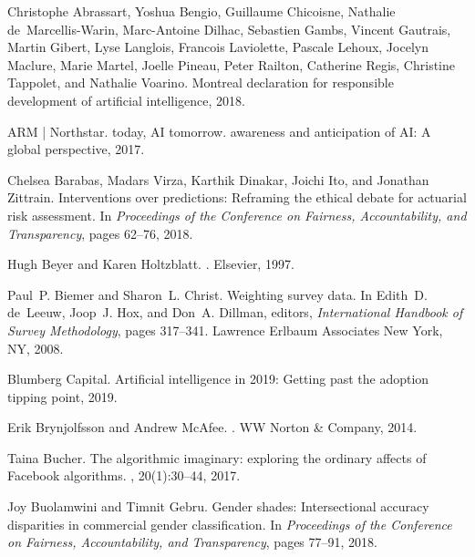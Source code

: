 \documentclass[11pt]{article} %
\begin{document}

\footnotesize
\begin{thebibliography}{10}

Christophe Abrassart, Yoshua Bengio, Guillaume Chicoisne, Nathalie
  de~Marcellis-Warin, Marc-Antoine Dilhac, Sebastien Gambs, Vincent Gautrais,
  Martin Gibert, Lyse Langlois, Francois Laviolette, Pascale Lehoux, Jocelyn
  Maclure, Marie Martel, Joelle Pineau, Peter Railton, Catherine Regis,
  Christine Tappolet, and Nathalie Voarino.
\newblock Montreal declaration for responsible development of artificial
  intelligence, 2018.

{ARM | Northstar}.
 today, {AI} tomorrow. awareness and anticipation of {AI}: A
  global perspective, 2017.

Chelsea Barabas, Madars Virza, Karthik Dinakar, Joichi Ito, and Jonathan
  Zittrain.
\newblock Interventions over predictions: Reframing the ethical debate for
  actuarial risk assessment.
\newblock In {\em Proceedings of the Conference on Fairness, Accountability,
  and Transparency}, pages 62--76, 2018.

Hugh Beyer and Karen Holtzblatt.
.
\newblock Elsevier, 1997.

Paul~P. Biemer and Sharon~L. Christ.
\newblock Weighting survey data.
\newblock In Edith~D. de~Leeuw, Joop~J. Hox, and Don~A. Dillman, editors, {\em
  International Handbook of Survey Methodology}, pages 317--341. Lawrence
  Erlbaum Associates New York, NY, 2008.

{Blumberg Capital}.
\newblock Artificial intelligence in 2019: Getting past the adoption tipping
  point, 2019.

Erik Brynjolfsson and Andrew McAfee.
.
\newblock WW Norton \& Company, 2014.

Taina Bucher.
\newblock The algorithmic imaginary: exploring the ordinary affects of
  {F}acebook algorithms.
, 20(1):30--44, 2017.

Joy Buolamwini and Timnit Gebru.
\newblock Gender shades: Intersectional accuracy disparities in commercial
  gender classification.
\newblock In {\em Proceedings of the Conference on Fairness, Accountability,
  and Transparency}, pages 77--91, 2018.


\end{thebibliography}
\end{document}
